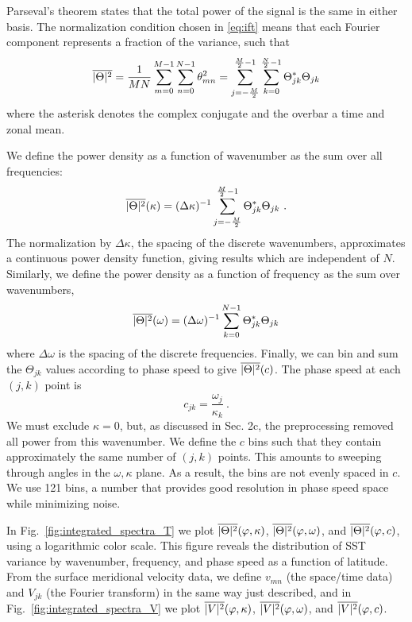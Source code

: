 \documentclass[10pt]{article}
\newcommand{\ol}{\ensuremath{\overline}}
\begin{document}
Parseval's theorem states that the total power of the signal is the same in either basis. The normalization condition chosen in \eqref{eq:ift} means that each Fourier component represents a fraction of the variance, such that 
\begin{equation}
\ol{|\Theta|^2} = \frac{1}{MN} \sum_{m=0}^{M-1} \sum_{n=0}^{N-1} \theta_{mn}^2 = \sum_{j=-\frac{M}{2}}^{\frac{M}{2}-1} \sum_{k=0}^{\frac{N}{2}-1} \Theta_{jk}^\ast  \Theta_{jk} 
\end{equation}
where the asterisk denotes the complex conjugate and the overbar a time and zonal mean.

We define the power density as a function of wavenumber as the sum over all frequencies:
\begin{equation}
\ol{|\Theta|^2}(\kappa) = (\Delta \kappa)^{-1} \sum_{j=-\frac{M}{2}}^{\frac{M}{2}-1} \Theta_{jk}^\ast  \Theta_{jk} \ .
\end{equation}
The normalization by $\Delta \kappa$, the spacing of the discrete wavenumbers, approximates a continuous power density function, giving results which are independent of $N$.  
Similarly, we define the power density as a function of frequency as the sum over wavenumbers,
\begin{equation}
\ol{|\Theta|^2}(\omega) = (\Delta \omega)^{-1} \sum_{k=0}^{N-1} \Theta_{jk}^\ast   \Theta_{jk} 
\end{equation}
where $\Delta \omega$ is the spacing of the discrete frequencies. Finally, we can bin and sum the $\Theta_{jk}$ values according to phase speed to give $\ol{|\Theta|^2}(c)$. The phase speed at each $(j,k)$ point is
\begin{equation}
c_{jk} = \frac{\omega_j}{\kappa_k} \ .
\end{equation}
We must exclude $\kappa = 0$, but, as discussed in Sec. 2c, the preprocessing removed all power from this wavenumber.
We define the $c$ bins such that they contain approximately the same number of $(j,k)$ points. This amounts to sweeping through angles in the $\omega, \kappa$ plane. As a result, the bins are not evenly spaced in $c$. We use 121 bins, a number that provides good resolution in phase speed space while minimizing noise.

In Fig.~\ref{fig:integrated_spectra_T} we plot $\ol{|\Theta|^2}(\varphi, \kappa)$, $\ol{|\Theta|^2}(\varphi, \omega)$, and $\ol{|\Theta|^2}(\varphi, c)$, using a logarithmic color scale. This figure reveals the distribution of SST variance by wavenumber, frequency, and phase speed as a function of latitude. From the surface meridional velocity data, we define $v_{mn}$ (the space/time data) and $V_{jk}$ (the Fourier transform) in the same way just described, and in Fig.~\ref{fig:integrated_spectra_V} we plot
$\ol{|V|^2}(\varphi, \kappa)$, $\ol{|V|^2}(\varphi, \omega)$, and $\ol{|V|^2}(\varphi, c)$.
\end{document}

